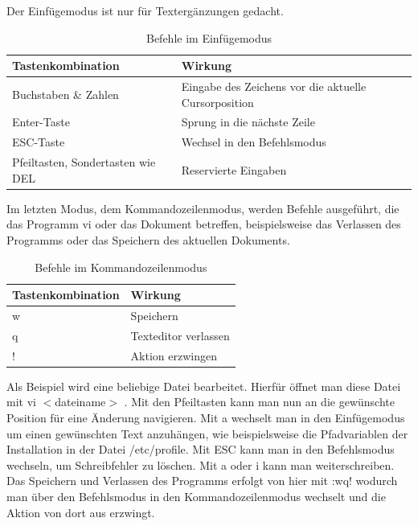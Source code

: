 \documentclass[12pt,a4paper]{article}
\begin{document}
Der Einfügemodus ist nur für Textergänzungen gedacht.

\begin{table} [H]
	\caption{Befehle im Einfügemodus}
	\label{tab:vi_einfuegemodus}
	\begin{tabularx}{\textwidth}{ | l | X | } 
		\hline
		Tastenkombination & Wirkung \\
		\hline \hline
		Buchstaben \& Zahlen & Eingabe des Zeichens vor die aktuelle Cursorposition \\ \hline
		Enter-Taste & Sprung in die nächste Zeile \\ \hline
		ESC-Taste & Wechsel in den Befehlsmodus \\ \hline
		Pfeiltasten, Sondertasten wie DEL & Reservierte Eingaben \\ \hline	
	\end{tabularx}
\end{table}

Im letzten Modus, dem Kommandozeilenmodus, werden Befehle ausgeführt, die das Programm vi oder das Dokument betreffen, beispielsweise das Verlassen des Programms oder das Speichern des aktuellen Dokuments.

\begin{table} [H]
	\caption{Befehle im Kommandozeilenmodus}
	\label{tab:vi_kommandozeilenmodus}
	\begin{tabularx}{\textwidth}{ | l | X | } 
		\hline
		Tastenkombination & Wirkung \\
		\hline \hline
		w & Speichern \\ \hline
		q & Texteditor verlassen \\ \hline
		! & Aktion erzwingen \\ \hline	
	\end{tabularx}
\end{table}

Als Beispiel wird eine beliebige Datei bearbeitet. Hierfür öffnet man diese Datei mit \glqq vi $<$dateiname$>$ \glqq{}. Mit den Pfeiltasten kann man nun an die gewünschte Position für eine Änderung navigieren. Mit \glqq a\grqq{} wechselt man in den Einfügemodus um einen gewünschten Text anzuhängen, wie beispielsweise die Pfadvariablen der Installation in der Datei /etc/profile. Mit ESC kann man in den Befehlsmodus wechseln, um Schreibfehler zu löschen. Mit \glqq a\grqq{} oder \glqq i\grqq{} kann man weiterschreiben. Das Speichern und Verlassen des Programms erfolgt von hier mit \glqq :wq!\grqq{} wodurch man über den Befehlsmodus in den Kommandozeilenmodus wechselt und die Aktion von dort aus erzwingt. 
\end{document}

